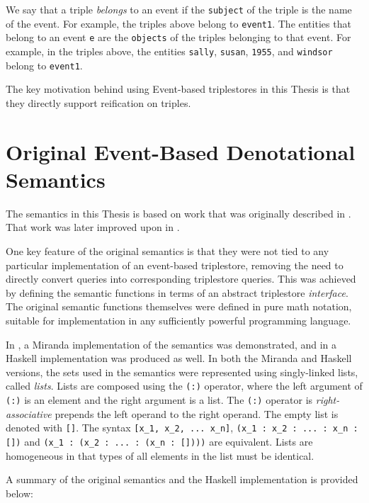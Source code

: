\documentclass[../main.tex]{subfiles}
\begin{document}
We say that a triple {\em belongs} to an event if the \texttt{subject} of the triple is the name of the event.  For example,
the triples above belong to \texttt{event1}.  The entities that belong to an event \texttt{e} are the \texttt{objects} of the triples belonging to that event.
For example, in the triples above, the entities \texttt{sally}, \texttt{susan}, \texttt{1955}, and \texttt{windsor} belong to \texttt{event1}.

The key motivation behind using Event-based triplestores in this Thesis is that they directly support reification on triples\cite{frostagboola2014}.

\section{Original Event-Based Denotational Semantics}

The semantics in this Thesis is based on work that was originally described in \cite{frost2013event}.  That work was later improved upon in \cite{frostagboola2014}.

One key feature of the original semantics is that they were not tied to any particular implementation of an event-based triplestore,
removing the need to directly convert queries into corresponding triplestore queries.
This was achieved by defining the semantic functions in terms of an abstract triplestore {\em interface}.
The original semantic functions themselves were defined in pure math notation, suitable for implementation in any sufficiently powerful programming language.

In \cite{frostagboola2014}, a Miranda implementation of the semantics was demonstrated, and in \cite{frost2014denotational} a Haskell
implementation was produced as well.  In both the Miranda and Haskell versions, the sets used in the semantics were represented using
singly-linked lists, called {\em lists}.  Lists are composed using the \texttt{(:)} operator, where the left argument of \texttt{(:)} is an element
and the right argument is a list.  The \texttt{(:)} operator is {\em right-associative} prepends the left operand to the right operand.  The empty list is denoted with
\texttt{[]}.  The syntax \texttt{[x\_1, x\_2, ... x\_n]}, \texttt{(x\_1 : x\_2 : ... : x\_n : [])} and \texttt{(x\_1 : (x\_2 : ... : (x\_n : [])))} are equivalent.
Lists are homogeneous in that types of all elements in the list must be identical.

A summary of the original semantics and the Haskell implementation is provided below:
\end{document}
